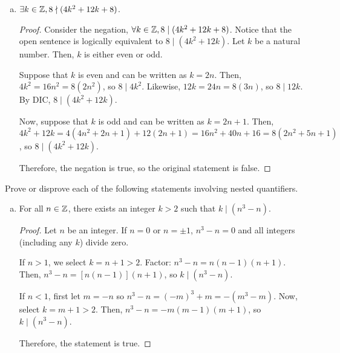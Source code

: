 \documentclass[11pt]{article}
\begin{document}
\begin{enumerate}[(a)]
    \item $\exists k\in\mathbb{Z}, 8\nmid(4k^2+12k+8)$.
    \begin{proof}
        Consider the negation, $\forall k\in\mathbb{Z}, 8\mid(4k^2+12k+8)$.
        Notice that the open sentence is logically equivalent to $8 \mid (4k^2+12k)$.
        Let $k$ be a natural number. Then, $k$ is either even or odd.
        
        Suppose that $k$ is even and can be written as $k=2n$.
        Then, $4k^2=16n^2=8(2n^2)$, so $8 \mid 4k^2$.
        Likewise, $12k=24n=8(3n)$, so $8 \mid 12k$.
        By DIC, $8 \mid (4k^2+12k)$.
        
        Now, suppose that $k$ is odd and can be written as $k=2n+1$.
        Then, $4k^2+12k = 4(4n^2+2n+1)+12(2n+1) = 16n^2 + 40n + 16 = 8(2n^2+5n+1)$, so $8 \mid (4k^2+12k)$.
        
        Therefore, the negation is true, so the original statement is false.
    \end{proof}
\end{enumerate}


\question Prove or disprove each of the following statements involving nested quantifiers.
\begin{enumerate}[(a)]
    \item For all $n \in\mathbb{Z}$, there exists an integer $k > 2$ such that $k \mid (n^3 - n)$.
    \begin{proof}
        Let $n$ be an integer. If $n=0$ or $n=\pm1$, $n^3-n=0$ and all integers (including any $k$) divide zero.
        
        If $n > 1$, we select $k=n+1 > 2$.
        Factor: $n^3-n = n(n-1)(n+1)$.
        Then, $n^3 - n = [n(n-1)](n+1)$, so $k \mid (n^3-n)$.
        
        If $n < 1$, first let $m = -n$ so $n^3-n = (-m)^3+m = -(m^3-m)$.
        Now, select $k = m+1 > 2$.
        Then, $n^3 - n = -m(m-1)(m+1)$, so $k \mid (n^3-n)$.
        
        Therefore, the statement is true.
    \end{proof}
\end{enumerate}
\end{document}
